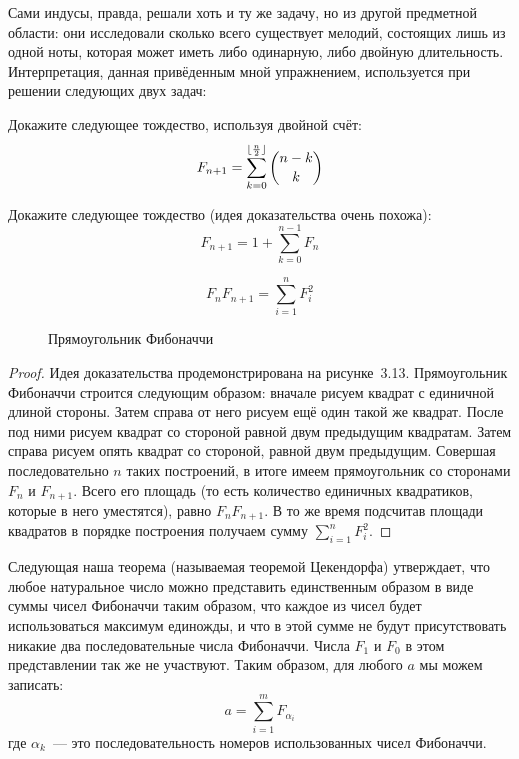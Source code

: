 Сами индусы, правда, решали хоть и ту же задачу, но из другой предметной области: они исследовали сколько всего существует мелодий, состоящих лишь из одной ноты, которая может иметь либо одинарную, либо двойную длительность. Интерпретация, данная привёденным мной упражнением, используется при решении следующих двух задач:

\begin{exercise}
Докажите следующее тождество, используя двойной счёт:
$$F_{n+1} = \sum_{k=0}^{\lfloor {n\over 2}\rfloor} {n-k\choose k}$$
\end{exercise}

\begin{exercise}
Докажите следующее тождество (идея доказательства очень похожа):
$$F_{n+1} = 1+ \sum_{k=0}^{n-1}F_n$$
\end{exercise}

\begin{thm}
$$F_n F_{n+1} = \sum_{i=1}^n F_i^2$$
\end{thm}
\begin{figure}[h]
\centering
{}
\caption{Прямоугольник Фибоначчи}
\end{figure}
\begin{proof}
Идея доказательства продемонстрирована на рисунке~3.13. Прямоугольник Фибоначчи строится следующим образом: вначале рисуем квадрат с единичной длиной стороны. Затем справа от него рисуем ещё один такой же квадрат. После под ними рисуем квадрат со стороной равной двум предыдущим квадратам. Затем справа рисуем опять квадрат со стороной, равной двум предыдущим. Совершая последовательно $n$ таких построений, в итоге имеем прямоугольник со сторонами $F_n$ и $F_{n+1}$. Всего его площадь (то есть количество единичных квадратиков, которые в него уместятся), равно $F_nF_{n+1}$. В то же время подсчитав площади квадратов в порядке построения получаем сумму  $\sum_{i=1}^n F_i^2$.
\end{proof}

Следующая наша теорема (называемая теоремой Цекендорфа) утверждает, что любое натуральное число можно представить единственным образом в виде суммы чисел Фибоначчи таким образом, что каждое из чисел будет использоваться максимум единожды, и что в этой сумме не будут присутствовать никакие два последовательные числа Фибоначчи. Числа $F_1$ и $F_0$ в этом представлении так же не участвуют. Таким образом, для любого $a$ мы можем записать:
\begin{equation}\label{non:1}
a = \sum_{i=1}^m F_{\alpha_i}
\end{equation}
где $\alpha_k$~--- это последовательность номеров использованных чисел Фибоначчи.

